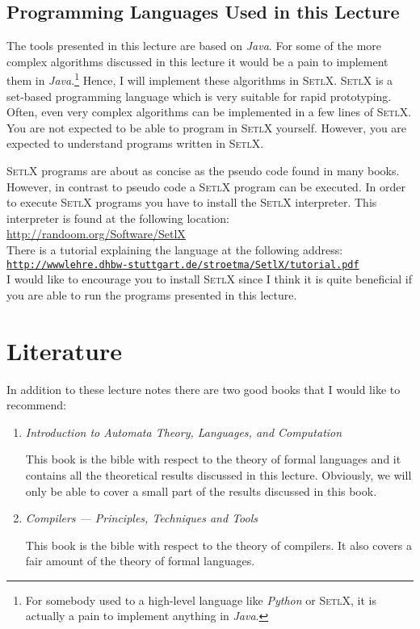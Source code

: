 \subsection{Programming Languages Used in this Lecture}
The tools presented in this lecture are based on 
\textsl{Java}.  For some of the more complex algorithms discussed in this lecture
it would be a pain to implement them in \textsl{Java}.\footnote{
For somebody used to a high-level language like \textsl{Python} or \textsc{SetlX},
it is actually a pain to implement anything in \textsl{Java}.
}
Hence, I will implement these algorithms in \textsc{SetlX}.  \textsc{SetlX} is a set-based
programming language which is very suitable for rapid prototyping.  Often, even very complex
algorithms can be implemented in a few lines of \textsc{SetlX}.  You are not expected to be able to
program in \textsc{SetlX} yourself.  However, you are expected to understand programs written in
\textsc{SetlX}.  

\textsc{SetlX} programs are about as concise as the pseudo code found in many books.  However, in
contrast to pseudo code a \textsc{SetlX} program can be executed.  In order to execute
\textsc{SetlX} programs you have to install the \textsc{SetlX} interpreter.  This interpreter is
found at the following location:
\\[0.2cm]
\hspace*{1.3cm}
\href{http://randoom.org/Software/SetlX}{{http://randoom.org/Software/SetlX}}
\\[0.2cm]
There is a tutorial explaining the language at the following address:
\\[0.2cm]
\hspace*{1.3cm}
\href{http://wwwlehre.dhbw-stuttgart.de/~stroetma/SetlX/tutorial.pdf}{\texttt{http://wwwlehre.dhbw-stuttgart.de/stroetma/SetlX/tutorial.pdf}}
\\[0.2cm]
I would like to encourage you to install \textsc{SetlX} since I think it is quite beneficial if you
are able to run the programs presented in this lecture. 
\pagebreak

\section{Literature}
In addition to these lecture notes there are two good books that I would like to recommend:
\begin{enumerate}
\item \emph{Introduction to Automata Theory, Languages, and Computation}
      \cite{hopcroft:06}

      This book is the bible with respect to the theory of formal languages and it contains all the theoretical
      results discussed in this lecture. 
      Obviously, we will only be able to cover a small part of the results discussed in this book.
\item \emph{Compilers --- Principles, Techniques and Tools}
      \cite{aho:2006}

      This book is the bible with respect to the theory of compilers.  It also covers a fair amount of
      the theory of formal languages.
\end{enumerate}


